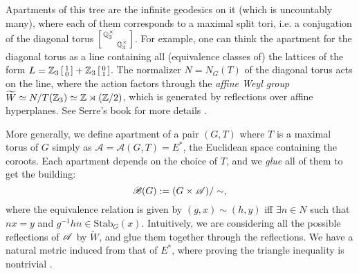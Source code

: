Apartments of this tree are the infinite geodesics on it (which is uncountably many), where each of them corresponds to a maximal split tori, i.e. a conjugation of the diagonal torus $\left[\begin{smallmatrix}
    \mathbb{Q}_3^\times & \\ & \mathbb{Q}_3^\times
\end{smallmatrix}\right]$.
For example, one can think the apartment for the diagonal torus as a line containing all (equivalence classes of) the lattices of the form $L = \mathbb{Z}_3 \left[\begin{smallmatrix} 1 \\ 0 \end{smallmatrix}\right] + \mathbb{Z}_3 \left[\begin{smallmatrix} 0 \\ 1\end{smallmatrix}\right]$.
The normalizer $N = N_G(T)$ of the diagonal torus acts on the line, where the action factors through the \emph{affine Weyl group} $\widetilde{W} \simeq N / T(\mathbb{Z}_3) \simeq \mathbb{Z} \rtimes (\mathbb{Z} / 2)$, which is generated by reflections over affine hyperplanes.
See Serre's book for more details \cite[Chapter II]{serre2002trees}.

More generally, we define apartment of a pair $(G, T)$ where $T$ is a maximal torus of $G$ simply as $\mathscr{A} = \mathscr{A}(G, T) = E^\ast$, the Euclidean space containing the coroots.
Each apartment depends on the choice of $T$, and we \emph{glue} all of them to get the building:
\[
    \mathscr{B}(G) := (G \times \mathscr{A}) / \sim,
\]
where the equivalence relation is given by $(g, x) \sim (h, y)$ iff $\exists n \in N$ such that $nx = y$ and $g^{-1}hn \in \mathrm{Stab}_{G}(x)$.
Intuitively, we are considering all the possible reflections of $\mathscr{A}$ by $\widetilde{W}$, and glue them together through the reflections.
We have a natural metric induced from that of $E^\ast$, where proving the triangle inequality is nontrivial \cite{bruhat1972groupes}.






